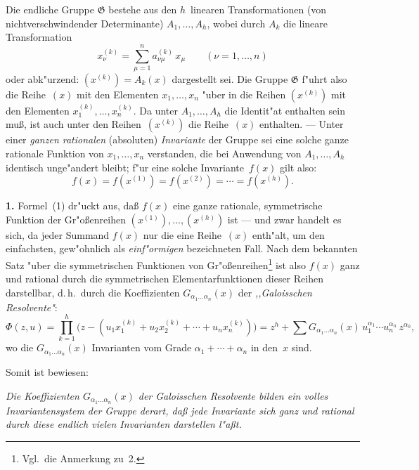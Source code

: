 \documentclass[11pt,a4paper]{article}
\begin{document}
Die endliche Gruppe $\mathfrak{G}$ bestehe aus den $h$~linearen Transformationen
(von nichtverschwindender Determinante)
$A_{1},\dots,A_{h}$, wobei durch $A_{k}$ die lineare Transformation
\[x_{\nu}^{(k)}=\sum_{\mu=1}^{n}a_{\nu\mu}^{(k)}\,x_{\mu}\qquad(\nu=1,\dots,n)\]
oder abk"{u}rzend: $(x^{(k)})=A_{k}(x)$ dargestellt sei. Die Gruppe $\mathfrak{G}$ f"{u}hrt
also die Reihe~$(x)$ mit den Elementen $x_{1},\dots,x_{n}$ "{u}ber in die Reihen
$(x^{(k)})$ mit den Elementen $x_{1}^{(k)},\dots,x_{n}^{(k)}$. Da unter $A_{1},\dots,A_{h}$ die
Identit"{a}t enthalten sein mu\ss{}, ist auch unter den Reihen~$(x^{(k)})$ die
Reihe~$(x)$ enthalten. --- Unter einer \emph{ganzen rationalen} (absoluten)
\emph{Invariante} der Gruppe sei eine solche ganze rationale Funktion von
$x_{1},\dots,x_{n}$ verstanden, die bei Anwendung von $A_{1},\dots,A_{h}$ identisch
unge"{a}ndert bleibt; f"{u}r eine solche Invariante~$f(x)$ gilt also:
\begin{equation}
f(x)=f(x^{(1)})=f(x^{(2)})=\cdots=f(x^{(h)}).\tag{1}
\end{equation}

\smallskip
\noindent
\textbf{1.} Formel~(1) dr"{u}ckt aus, da\ss{} $f(x)$ eine ganze rationale, symmetrische
Funktion der Gr"{o}\ss{}enreihen $(x^{(1)}),\dots,(x^{(h)})$ ist --- und zwar handelt
es sich, da jeder Summand $f(x)$ nur die eine Reihe~$(x)$ enth"{a}lt, um
den einfachsten, gew"{o}hnlich als \emph{einf"{o}rmigen} bezeichneten Fall. Nach dem
bekannten Satz "{u}ber die symmetrischen Funktionen von Gr"{o}\ss{}enreihen\footnote{Vgl.\ die Anmerkung zu~2.} ist also $f(x)$ ganz und rational durch die symmetrischen
Elementarfunktionen dieser Reihen darstellbar, d.\,h.\ durch die
Koeffizienten $G_{\alpha_{1}\dots\alpha_{n}}(x)$ der \emph{,,Galoisschen Resolvente"{}}:
\begin{equation}
\Phi(z,u)=\prod_{k=1}^{h}\bigl(z-(u_{1}x_{1}^{(k)}+u_{2}x_{2}^{(k)}+\cdots+u_{n}x_{n}^{(k)})\bigr)
=z^{h}+\sum G_{\alpha_{1}\dots\alpha_{n}}(x)\,u_{1}^{\alpha_{1}}\cdots u_{n}^{\alpha_{n}}\,z^{\alpha_{0}},
\tag{2}
\end{equation}
wo die $G_{\alpha_{1}\dots\alpha_{n}}(x)$ Invarianten vom Grade $\alpha_{1}+\cdots+\alpha_{n}$ in den~$x$ sind.

Somit ist bewiesen:

\smallskip
\emph{Die Koeffizienten $G_{\alpha_{1}\dots\alpha_{n}}(x)$ der Galoisschen Resolvente bilden
ein volles Invariantensystem der Gruppe derart, da\ss{} jede Invariante sich
ganz und rational durch diese endlich vielen Invarianten darstellen
l"{a}\ss{}t.}
\end{document}
